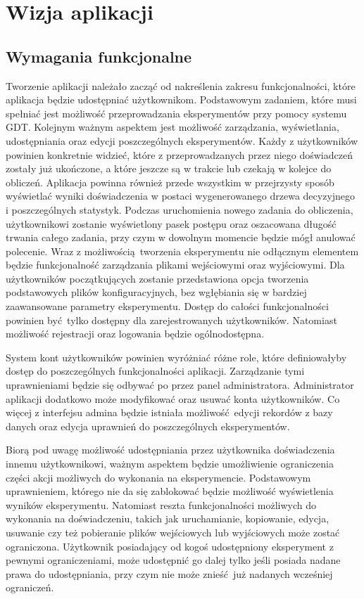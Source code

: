 \chapter{Wizja aplikacji}

\section{Wymagania funkcjonalne}
Tworzenie aplikacji należało zacząć od nakreślenia zakresu funkcjonalności, które aplikacja będzie udostępniać użytkownikom. Podstawowym zadaniem, które musi spełniać jest możliwość przeprowadzania eksperymentów przy pomocy systemu GDT. Kolejnym ważnym aspektem jest możliwość zarządzania, wyświetlania, udostępniania oraz edycji poszczególnych eksperymentów. Każdy z użytkowników powinien konkretnie widzieć, które z przeprowadzanych przez niego doświadczeń zostały już ukończone, a które jeszcze są w trakcie lub czekają w kolejce do obliczeń. Aplikacja powinna również przede wszystkim w przejrzysty sposób wyświetlać wyniki doświadczenia w postaci wygenerowanego drzewa decyzyjnego i poszczególnych statystyk. Podczas uruchomienia nowego zadania do obliczenia, użytkownikowi zostanie wyświetlony pasek postępu oraz oszacowana długość trwania całego zadania, przy czym w dowolnym momencie będzie mógł anulować polecenie.  Wraz z możliwością tworzenia eksperymentu nie odłącznym elementem będzie funkcjonalność zarządzania plikami wejściowymi oraz wyjściowymi. Dla użytkowników początkujących zostanie przedstawiona opcja tworzenia podstawowych plików konfiguracyjnych, bez wgłębiania się w bardziej zaawansowane parametry eksperymentu. Dostęp do całości funkcjonalności powinien być tylko dostępny dla zarejestrowanych użytkowników. Natomiast możliwość rejestracji oraz logowania będzie ogólnodostępna.

System kont użytkowników powinien wyróżniać różne role, które definiowałyby dostęp do poszczególnych funkcjonalności aplikacji. Zarządzanie tymi uprawnieniami będzie się odbywać po przez panel administratora. Administrator aplikacji dodatkowo może modyfikować oraz usuwać konta użytkowników. Co więcej z interfejsu admina będzie istniała możliwość edycji rekordów z bazy danych oraz edycja uprawnień do poszczególnych eksperymentów. 

Biorą pod uwagę możliwość udostępniania przez użytkownika doświadczenia innemu użytkownikowi, ważnym aspektem będzie umożliwienie ograniczenia części akcji możliwych do wykonania na eksperymencie. Podstawowym uprawnieniem, którego nie da się zablokować będzie możliwość wyświetlenia wyników eksperymentu. Natomiast reszta funkcjonalności możliwych do wykonania na doświadczeniu, takich jak uruchamianie, kopiowanie, edycja, usuwanie czy też pobieranie plików wejściowych lub wyjściowych może zostać ograniczona. Użytkownik posiadający od kogoś udostępniony eksperyment z pewnymi ograniczeniami, może udostępnić go dalej tylko jeśli posiada nadane prawa do udostępniania, przy czym nie może znieść już nadanych wcześniej ograniczeń.


